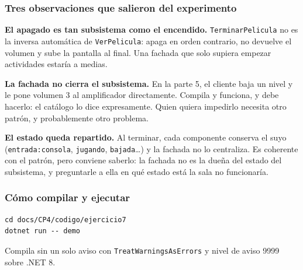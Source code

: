 \subsubsection*{Tres observaciones que salieron del experimento}

\textbf{El apagado es tan subsistema como el encendido.} \texttt{TerminarPelicula} no es la
inversa automática de \texttt{VerPelicula}: apaga en orden contrario, no devuelve el volumen
y sube la pantalla al final. Una fachada que solo supiera empezar actividades estaría a medias.

\textbf{La fachada no cierra el subsistema.} En la parte 5, el cliente baja un nivel y le pone
volumen 3 al amplificador directamente. Compila y funciona, y debe hacerlo: el catálogo lo
dice expresamente. Quien quiera impedirlo necesita otro patrón, y probablemente otro problema.

\textbf{El estado queda repartido.} Al terminar, cada componente conserva el suyo
(\texttt{entrada:consola}, \texttt{jugando}, \texttt{bajada}\ldots) y la fachada no lo
centraliza. Es coherente con el patrón, pero conviene saberlo: la fachada no es la dueña del
estado del subsistema, y preguntarle a ella en qué estado está la sala no funcionaría.

\subsubsection*{Cómo compilar y ejecutar}

{\small
\begin{verbatim}
cd docs/CP4/codigo/ejercicio7
dotnet run -- demo
\end{verbatim}
}

Compila sin un solo aviso con \texttt{TreatWarningsAsErrors} y nivel de aviso 9999 sobre
.NET 8.

\fussy
